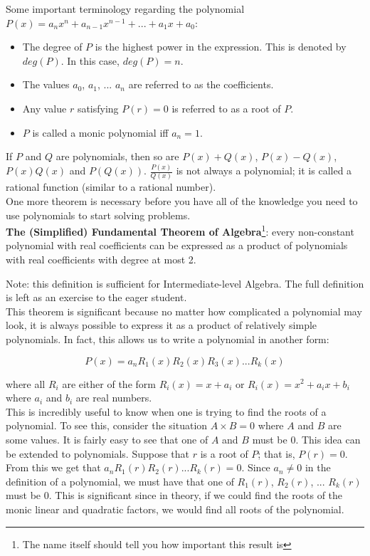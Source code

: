 \documentclass[a4paper,12pt]{article}
\begin{document}
Some important terminology regarding the polynomial $P(x) = a_nx^n + a_{n - 1}x^{n - 1} + ... + a_1x + a_0$:
\begin{itemize}

\item The degree of $P$ is the highest power in the expression. This is denoted by $deg(P)$. In this case, $deg(P) = n$.

\item The values $a_0$, $a_1$, ... $a_n$ are referred to as the coefficients.

\item Any value $r$ satisfying $P(r) = 0$ is referred to as a root of $P$.

\item $P$ is called a monic polynomial iff $a_n = 1$.

\end{itemize}

If $P$ and $Q$ are polynomials, then so are $P(x) + Q(x)$, $P(x) - Q(x)$, $P(x)Q(x)$ and $P(Q(x))$. $\frac{P(x)}{Q(x)}$ is not always a polynomial; it is called a rational function (similar to a rational number). \\

One more theorem is necessary before you have all of the knowledge you need to use polynomials to start solving problems. \\

\textbf{The (Simplified) Fundamental Theorem of Algebra}\footnote{The name itself should tell you how important this result is}: every non-constant polynomial with real coefficients can be expressed as a product of polynomials with real coefficients with degree at most 2.

Note: this definition is sufficient for Intermediate-level Algebra. The full definition is left as an exercise to the eager student. \\

This theorem is significant because no matter how complicated a polynomial may look, it is always possible to express it as a product of relatively simple polynomials. In fact, this allows us to write a polynomial in another form:

$$P(x) = a_nR_1(x)R_2(x)R_3(x)...R_k(x)$$

where all $R_i$ are either of the form $R_i(x) = x + a_i$ or $R_i(x) = x^2 + a_ix + b_i$ where $a_i$ and $b_i$ are real numbers. \\

This is incredibly useful to know when one is trying to find the roots of a polynomial. To see this, consider the situation $A \times B = 0$ where $A$ and $B$ are some values. It is fairly easy to see that one of $A$ and $B$ must be $0$. This idea can be extended to polynomials. Suppose that $r$ is a root of $P$; that is, $P(r) = 0$. From this we get that $a_nR_1(r)R_2(r)...R_k(r) = 0$. Since $a_n \neq 0$ in the definition of a polynomial, we must have that one of $R_1(r)$, $R_2(r)$, ... $R_k(r)$ must be $0$. This is significant since in theory, if we could find the roots of the monic linear and quadratic factors, we would find all roots of the polynomial.
\end{document}
